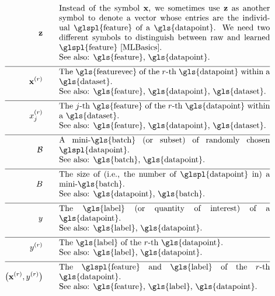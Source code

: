\begin{align}
	\rawfeaturevec \quad\quad &\parbox{.75\textwidth}{Instead of the symbol $\featurevec$, we 
		sometimes use $\rawfeaturevec$ as another symbol to denote a vector whose entries 
		are the individual \glspl{feature} of a \gls{datapoint}. We need two 
		different symbols to distinguish between raw and learned \glspl{feature} \cite[Ch. 9]{MLBasics}.
		\\ See also: \gls{feature}, \gls{datapoint}. }\nonumber \\[2mm] \hline \nonumber\\[-5mm]
	\featurevec^{(\sampleidx)} \quad\quad &\parbox{.75\textwidth}{The \gls{featurevec} of the $\sampleidx$-th \gls{datapoint} within a \gls{dataset}.
		\\ See also: \gls{feature}, \gls{datapoint}, \gls{dataset}. } \nonumber \\[2mm] \hline \nonumber\\[-5mm]
	\feature_{\featureidx}^{(\sampleidx)}\quad\quad &\parbox{.75\textwidth}{The $\featureidx$-th \gls{feature} of the $\sampleidx$-th 
		\gls{datapoint} within a \gls{dataset}.
		\\ See also: \gls{feature}, \gls{datapoint}, \gls{dataset}.} \nonumber \\[2mm] \hline \nonumber\\[-5mm]
	\batch \quad\quad &\parbox{.75\textwidth}{A mini-\gls{batch} (or subset) of randomly chosen \glspl{datapoint}.
		\\ See also: \gls{batch}, \gls{datapoint}. }\nonumber \\[2mm] \hline \nonumber\\[-5mm]
	\batchsize \quad\quad &\parbox{.75\textwidth}{The size of (i.e., the number of \glspl{datapoint} in) a mini-\gls{batch}.
		\\ See also: \gls{datapoint}, \gls{batch}. }\nonumber \\[2mm] \hline \nonumber\\[-5mm]
	\truelabel \quad\quad &\parbox{.75\textwidth}{The \gls{label} (or quantity of interest) of a \gls{datapoint}.
		\\ See also: \gls{label}, \gls{datapoint}. } \nonumber \\[2mm] \hline \nonumber\\[-5mm]
	\truelabel^{(\sampleidx)} \quad\quad &\parbox{.75\textwidth}{The \gls{label} of the $\sampleidx$-th \gls{datapoint}.
		\\ See also: \gls{label}, \gls{datapoint}. } \nonumber \\[2mm] \hline \nonumber\\[-5mm]
	\big(\featurevec^{(\sampleidx)},\truelabel^{(\sampleidx)}\big)  \quad\quad &\parbox{.75\textwidth}{The \glspl{feature} and \gls{label} of the $\sampleidx$-th \gls{datapoint}.
		\\ See also: \gls{feature}, \gls{label}, \gls{datapoint}. }\nonumber 
\end{align}                  


